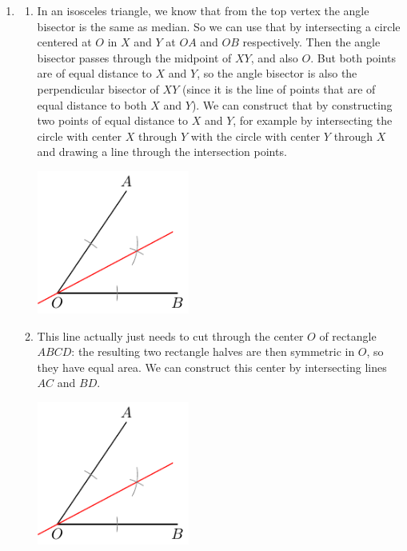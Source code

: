 \documentclass[11pt]{scrartcl}
\begin{document}
\begin{enumerate}[label=\textbf{G\arabic*}.]
    \item \begin{enumerate}
        \item In an isosceles triangle, we know that from the top vertex the angle bisector is the same as median. So we can use that by intersecting a circle centered at $O$ in $X$ and $Y$ at $OA$ and $OB$ respectively. Then the angle bisector passes through the midpoint of $XY$, and also $O$. But both points are of equal distance to $X$ and $Y$, so the angle bisector is also the perpendicular bisector of $XY$ (since it is the line of points that are of equal distance to both $X$ and $Y$). We can construct that by constructing two points of equal distance to $X$ and $Y$, for example by intersecting the circle with center $X$ through $Y$ with the circle with center $Y$ through $X$ and drawing a line through the intersection points.
        
        \begin{center}
        \includegraphics[width = 5cm, page = 1]{Diagrams/W2G1sol.pdf}
        \end{center}
        
        \item This line actually just needs to cut through the center $O$ of rectangle $ABCD$: the resulting two rectangle halves are then symmetric in $O$, so they have equal area. We can construct this center by intersecting lines $AC$ and $BD$.
        
        \begin{center}
        \includegraphics[width = 5cm, page = 2]{Diagrams/W2G1sol.pdf}
        \end{center}
        

\end{enumerate}
\end{enumerate}
\end{document}
